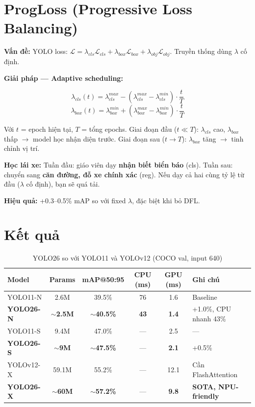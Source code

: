 \documentclass[12pt,a4paper]{report}
\begin{document}
\section{ProgLoss (Progressive Loss Balancing)}

\textbf{Vấn đề:} YOLO loss: $\mathcal{L} = \lambda_{cls} \mathcal{L}_{cls} + \lambda_{box} \mathcal{L}_{box} + \lambda_{obj} \mathcal{L}_{obj}$. Truyền thống dùng $\lambda$ cố định.

\textbf{Giải pháp --- Adaptive scheduling:}

\begin{equation}
\lambda_{cls}(t) = \lambda_{cls}^{max} - (\lambda_{cls}^{max} - \lambda_{cls}^{min}) \cdot \frac{t}{T}
\end{equation}
\begin{equation}
\lambda_{box}(t) = \lambda_{box}^{min} + (\lambda_{box}^{max} - \lambda_{box}^{min}) \cdot \frac{t}{T}
\end{equation}

Với $t$ = epoch hiện tại, $T$ = tổng epochs. Giai đoạn đầu ($t \ll T$): $\lambda_{cls}$ cao, $\lambda_{box}$ thấp $\rightarrow$ model học nhận diện trước. Giai đoạn sau ($t \to T$): $\lambda_{box}$ tăng $\rightarrow$ tinh chỉnh vị trí.

\begin{analogybox}
\textbf{Học lái xe:} Tuần đầu: giáo viên dạy \textbf{nhận biết biển báo} (cls). Tuần sau: chuyển sang \textbf{căn đường, đỗ xe chính xác} (reg). Nếu dạy cả hai cùng tỷ lệ từ đầu ($\lambda$ cố định), bạn sẽ quá tải.
\end{analogybox}

\textbf{Hiệu quả:} +0.3--0.5\% mAP so với fixed $\lambda$, đặc biệt khi bỏ DFL.

\section{Kết quả}
\begin{table}[H]\centering
\caption{YOLO26 so với YOLO11 và YOLOv12 (COCO val, input 640)}
\begin{tabular}{lccccl}\toprule
\textbf{Model} & \textbf{Params} & \textbf{mAP@50:95} & \textbf{CPU (ms)} & \textbf{GPU (ms)} & \textbf{Ghi chú}\\\midrule
YOLO11-N & 2.6M & 39.5\% & 76 & 1.6 & Baseline \\
\textbf{YOLO26-N} & \textbf{$\sim$2.5M} & \textbf{$\sim$40.5\%} & \textbf{43} & \textbf{1.4} & +1.0\%, CPU nhanh 43\% \\
YOLO11-S & 9.4M & 47.0\% & --- & 2.5 & --- \\
\textbf{YOLO26-S} & \textbf{$\sim$9M} & \textbf{$\sim$47.5\%} & --- & \textbf{2.1} & +0.5\% \\
YOLOv12-X & 59.1M & 55.2\% & --- & 12.1 & Cần FlashAttention \\
\textbf{YOLO26-X} & \textbf{$\sim$60M} & \textbf{$\sim$57.2\%} & --- & \textbf{9.8} & \textbf{SOTA, NPU-friendly} \\\bottomrule
\end{tabular}
\end{table}
\end{document}
